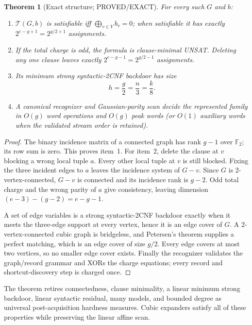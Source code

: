 \documentclass[11pt]{article}
\newtheorem{theorem}{Theorem}
\begin{document}
\begin{theorem}[Exact structure; PROVED/EXACT]
For every such $G$ and $b$:
\begin{enumerate}
\item $\mathcal T(G,b)$ is satisfiable iff $\bigoplus_{v\in V}b_v=0$; when satisfiable it has exactly $2^{e-g+1}=2^{g/2+1}$ assignments.
\item If the total charge is odd, the formula is clause-minimal UNSAT. Deleting any one clause leaves exactly $2^{e-g-1}=2^{g/2-1}$ assignments.
\item Its minimum strong syntactic-2CNF backdoor has size
\[
 h=\frac g2=\frac n3=\frac k8.
\]
\item A canonical recognizer and Gaussian-parity scan decide the represented family in $O(g)$ word operations and $O(g)$ peak words (or $O(1)$ auxiliary words when the validated stream order is retained).
\end{enumerate}
\end{theorem}
\begin{proof}
The binary incidence matrix of a connected graph has rank $g-1$ over $\mathbb F_2$; its row sum is zero. This proves item~1. For item~2, delete the clause at $v$ blocking a wrong local tuple $a$. Every other local tuple at $v$ is still blocked. Fixing the three incident edges to $a$ leaves the incidence system of $G-v$. Since $G$ is 2-vertex-connected, $G-v$ is connected and its incidence rank is $g-2$. Odd total charge and the wrong parity of $a$ give consistency, leaving dimension $(e-3)-(g-2)=e-g-1$.

A set of edge variables is a strong syntactic-2CNF backdoor exactly when it meets the three-edge support at every vertex, hence it is an edge cover of $G$. A 2-vertex-connected cubic graph is bridgeless, and Petersen's theorem supplies a perfect matching, which is an edge cover of size $g/2$. Every edge covers at most two vertices, so no smaller edge cover exists. Finally the recognizer validates the graph/record grammar and XORs the charge equations; every record and shortcut-discovery step is charged once.
\end{proof}

The theorem retires connectedness, clause minimality, a linear minimum strong backdoor, linear syntactic residual, many models, and bounded degree as universal post-acquisition hardness measures. Cubic expanders satisfy all of these properties while preserving the linear affine scan.
\end{document}
